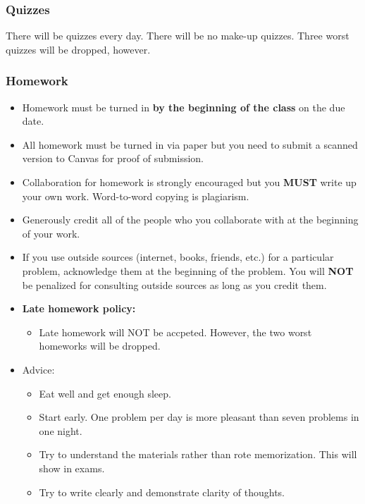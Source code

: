 \documentclass[
]{article}
\providecommand{\tightlist}{%
  \setlength{\itemsep}{0pt}\setlength{\parskip}{0pt}}
\begin{document}
\hypertarget{quizzes}{%
\subsubsection*{Quizzes}\label{quizzes}}

There will be quizzes every day.
There will be no make-up quizzes.
Three worst quizzes will be dropped, however.

\hypertarget{homework}{%
\subsubsection*{Homework}\label{homework}}

\begin{itemize}
\tightlist
\item
  Homework must be turned in \textbf{by the beginning of the class} on the due date.
\item
  All homework must be turned in via paper but you need to submit a scanned version to Canvas for proof of submission.
\item
  Collaboration for homework is strongly encouraged but you \textbf{MUST} write up your own work. Word-to-word copying is plagiarism.
\item
  Generously credit all of the people who you collaborate with at the beginning of your work.
\item
  If you use outside sources (internet, books, friends, etc.) for a particular problem, acknowledge them at the beginning of the problem.
  You will \textbf{NOT} be penalized for consulting outside sources as long as you credit them.
\item
  \textbf{Late homework policy:}

  \begin{itemize}
  \tightlist
  \item
    Late homework will NOT be accpeted. However, the two worst homeworks will be dropped.
  \end{itemize}
\item
  Advice:

  \begin{itemize}
  \tightlist
  \item
    Eat well and get enough sleep.
  \item
    Start early. One problem per day is more pleasant than seven problems in one night.
  \item
    Try to understand the materials rather than rote memorization. This will show in exams.
  \item
    Try to write clearly and demonstrate clarity of thoughts.
  \end{itemize}
\end{itemize}
\end{document}
